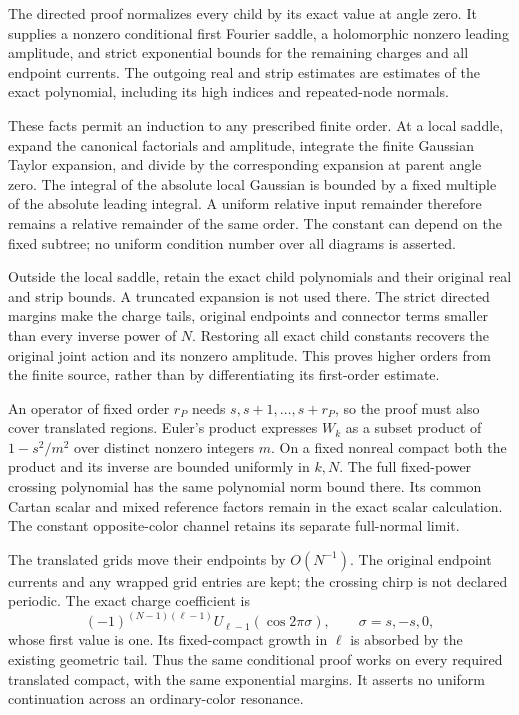 The directed proof normalizes every child by its exact value at
angle zero. It supplies a nonzero conditional first Fourier saddle,
a holomorphic nonzero leading amplitude, and strict exponential
bounds for the remaining charges and all endpoint currents. The
outgoing real and strip estimates are estimates of the exact
polynomial, including its high indices and repeated-node normals.

These facts permit an induction to any prescribed finite order.
At a local saddle, expand the canonical factorials and amplitude,
integrate the finite Gaussian Taylor expansion, and divide by the
corresponding expansion at parent angle zero. The integral of the
absolute local Gaussian is bounded by a fixed multiple of the
absolute leading integral. A uniform relative input remainder
therefore remains a relative remainder of the same order. The
constant can depend on the fixed subtree; no uniform condition
number over all diagrams is asserted.

Outside the local saddle, retain the exact child polynomials and
their original real and strip bounds. A truncated expansion is not
used there. The strict directed margins make the charge tails,
original endpoints and connector terms smaller than every inverse
power of $N$. Restoring all exact child constants recovers the
original joint action and its nonzero amplitude. This proves higher
orders from the finite source, rather than by differentiating its
first-order estimate.

An operator of fixed order $r_P$ needs $s,s+1,\ldots,s+r_P$, so the proof must
also cover translated regions. Euler's product expresses $W_k$ as
a subset product of $1-s^2/m^2$ over distinct nonzero integers $m$.
On a fixed nonreal compact both the product and its inverse are
bounded uniformly in $k,N$. The full fixed-power crossing polynomial
has the same polynomial norm bound there. Its common Cartan scalar
and mixed reference factors remain in the exact scalar calculation.
The constant opposite-color channel retains its separate full-normal
limit.

The translated grids move their endpoints by $O(N^{-1})$. The
original endpoint currents and any wrapped grid entries are kept;
the crossing chirp is not declared periodic. The exact charge
coefficient is
\[
 (-1)^{(N-1)(\ell-1)}U_{\ell-1}(\cos2\pi\sigma),
        \qquad \sigma=s,-s,0,
\]
whose first value is one. Its fixed-compact growth in $\ell$ is
absorbed by the existing geometric tail. Thus the same conditional
proof works on every required translated compact, with the same
exponential margins. It asserts no uniform continuation across an
ordinary-color resonance.

